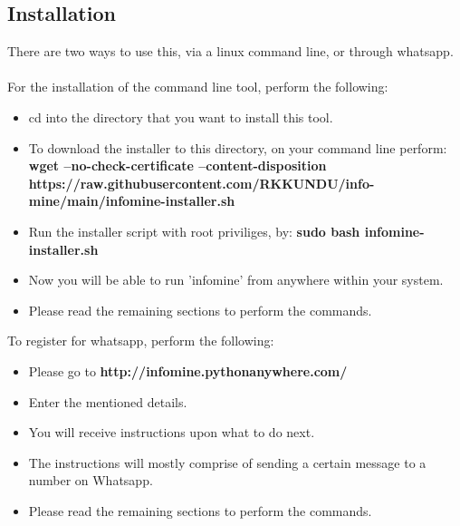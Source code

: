 \documentclass[12pt, letterpaper, twoside]{article}
\begin{document}
    \subsection{Installation}
        There are two ways to use this, via a linux command line, or through whatsapp. \\ 
        \\
        For the installation of the command line tool, perform the following:
        \begin{itemize}
            \item cd into the directory that you want to install this tool.
            \item To download the installer to this directory, on your command line perform: \textbf{wget --no-check-certificate --content-disposition https://raw.githubusercontent.com/RKKUNDU/info-mine/main/infomine-installer.sh}
            \item Run the installer script with root priviliges, by: \textbf{sudo bash infomine-installer.sh}
            \item Now you will be able to run 'infomine' from anywhere within your system.
            \item Please read the remaining sections to perform the commands.
        \end{itemize} 
        To register for whatsapp, perform the following:
        \begin{itemize}
            \item Please go to \textbf{http://infomine.pythonanywhere.com/}
            \item Enter the mentioned details.
            \item You will receive instructions upon what to do next.
            \item The instructions will mostly comprise of sending a certain message to a number on Whatsapp.
            \item Please read the remaining sections to perform the commands.
        \end{itemize}
\end{document}
